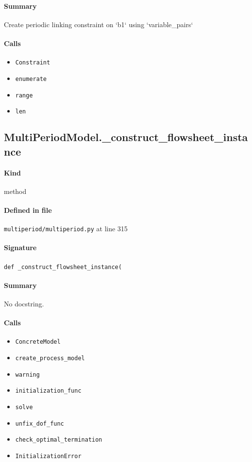 \documentclass[11pt]{report}
\begin{document}
\paragraph{Summary} Create periodic linking constraint on `b1` using `variable\_pairs`
\paragraph{Calls}
\begin{itemize}[leftmargin=*]
  \item \texttt{Constraint}
  \item \texttt{enumerate}
  \item \texttt{range}
  \item \texttt{len}
\end{itemize}
\subsection{MultiPeriodModel.\_construct\_flowsheet\_instance}
\label{def:multiperiod-multiperiod.py:MultiPeriodModel._construct_flowsheet_instance:L315}
\paragraph{Kind} method
\paragraph{Defined in file} \texttt{multiperiod/multiperiod.py} at line 315
\paragraph{Signature} \texttt{def \_construct\_flowsheet\_instance(}
\paragraph{Summary} No docstring.
\paragraph{Calls}
\begin{itemize}[leftmargin=*]
  \item \texttt{ConcreteModel}
  \item \texttt{create\_process\_model}
  \item \texttt{warning}
  \item \texttt{initialization\_func}
  \item \texttt{solve}
  \item \texttt{unfix\_dof\_func}
  \item \texttt{check\_optimal\_termination}
  \item \texttt{InitializationError}
\end{itemize}
\end{document}

